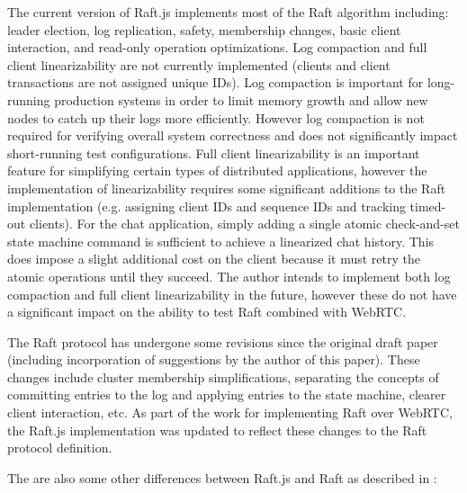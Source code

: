 \documentclass[conference,compsoc]{./IEEEtran/IEEEtran}
\begin{document}
The current version of Raft.js implements most of the Raft algorithm
including: leader election, log replication, safety, membership
changes, basic client interaction, and read-only operation
optimizations. %
Log compaction and full client linearizability are not currently
implemented (clients and client transactions are not assigned unique
IDs). Log compaction is important for long-running production systems
in order to limit memory growth and allow new nodes to catch up their
logs more efficiently. However log compaction is not required for
verifying overall system correctness and does not significantly impact
short-running test configurations. Full client linearizability is
an important feature for simplifying certain types of distributed
applications, however the implementation of linearizability requires
some significant additions to the Raft implementation (e.g. assigning
client IDs and sequence IDs and tracking timed-out clients). For the
chat application, simply adding a single atomic check-and-set state
machine command is sufficient to achieve a linearized chat history.
This does impose a slight additional cost on the client because it
must retry the atomic operations until they succeed. The author
intends to implement both log compaction and full client
linearizability in the future, however these do not have a significant
impact on the ability to test Raft combined with WebRTC.

The Raft protocol has undergone some revisions since the original
draft paper \cite{raft_paper:ongaro14} (including incorporation of
suggestions by the author of this paper). These changes include
cluster membership simplifications, separating the concepts of
committing entries to the log and applying entries to the state
machine, clearer client interaction, etc. As part of the work for
implementing Raft over WebRTC, the Raft.js implementation was updated
to reflect these changes to the Raft protocol definition.

The are also some other differences between Raft.js and Raft as
described in \cite[Consensus:~Diego]{raft_thesis:ongaro14}:
\end{document}
